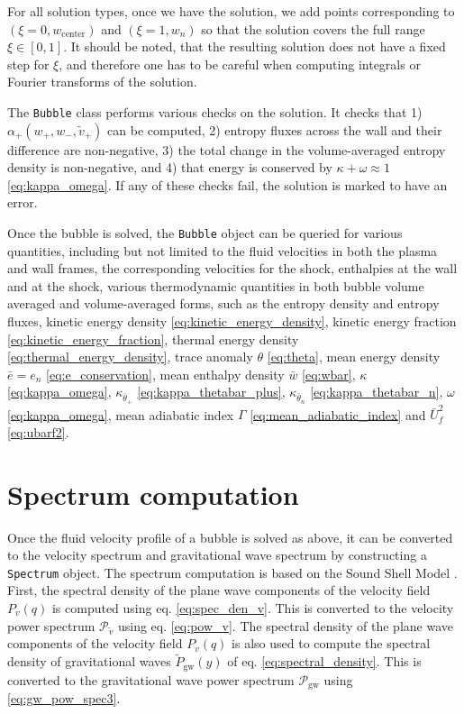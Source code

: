 For all solution types, once we have the solution,
we add points corresponding to $(\xi=0, w_\text{center})$ and $(\xi=1, w_n)$
so that the solution covers the full range $\xi \in [0, 1]$.
It should be noted, that the resulting solution does not have a fixed step for $\xi$,
and therefore one has to be careful when computing integrals or Fourier transforms of the solution.

The \verb|Bubble| class performs various checks on the solution.
It checks that
1) $\alpha_+(w_+, w_-, \tilde{v}_+)$ can be computed,
2) entropy fluxes across the wall and their difference are non-negative,
3) the total change in the volume-averaged entropy density is non-negative, and
4) that energy is conserved by $\kappa + \omega \approx 1$ \eqref{eq:kappa_omega}.
If any of these checks fail, the solution is marked to have an error.

Once the bubble is solved, the \verb|Bubble| object can be queried for various quantities,
including but not limited to the fluid velocities in both the plasma and wall frames,
the corresponding velocities for the shock,
enthalpies at the wall and at the shock,
various thermodynamic quantities in both bubble volume averaged and volume-averaged forms,
such as the entropy density and entropy fluxes,
kinetic energy density \eqref{eq:kinetic_energy_density},
kinetic energy fraction \eqref{eq:kinetic_energy_fraction},
thermal energy density \eqref{eq:thermal_energy_density},
trace anomaly $\theta$ \eqref{eq:theta},
mean energy density $\bar{e} = e_n$ \eqref{eq:e_conservation},
mean enthalpy density $\bar{w}$ \eqref{eq:wbar},
$\kappa$ \eqref{eq:kappa_omega},
$\kappa_{\bar{\theta}_+}$ \eqref{eq:kappa_thetabar_plus},
$\kappa_{\bar{\theta}_n}$ \eqref{eq:kappa_thetabar_n},
$\omega$ \eqref{eq:kappa_omega},
mean adiabatic index $\Gamma$ \eqref{eq:mean_adiabatic_index} and
$\bar{U}_f^2$ \eqref{eq:ubarf2}.


\section{Spectrum computation}
Once the fluid velocity profile of a bubble is solved as above,
it can be converted to the velocity spectrum and gravitational wave spectrum by constructing a \verb|Spectrum| object.
The spectrum computation is based on the Sound Shell Model \cite{hindmarsh_gw_pt_2019}.
First, the spectral density of the plane wave components of the velocity field $P_v(q)$ is computed using eq. \eqref{eq:spec_den_v}.
This is converted to the velocity power spectrum $\mathcal{P}_{\tilde{v}}$ using eq. \eqref{eq:pow_v}.
The spectral density of the plane wave components of the velocity field $P_v(q)$ is also used to compute the spectral density of gravitational waves $\tilde{P}_{\text{gw}}(y)$ of eq. \eqref{eq:spectral_density}.
This is converted to the gravitational wave power spectrum $\mathcal{P}_{\text{gw}}$ using \eqref{eq:gw_pow_spec3}.


